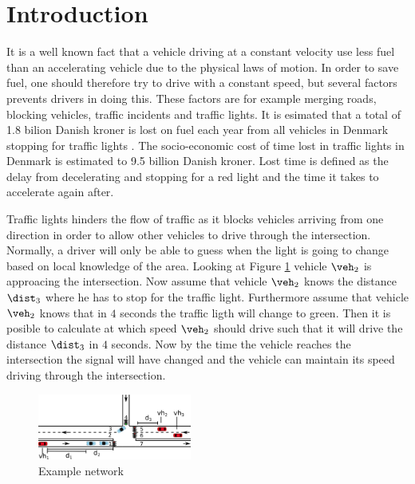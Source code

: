 \section{Introduction}

It is a well known fact that a vehicle driving at a constant velocity use less fuel than an accelerating vehicle due to the physical laws of motion\cite{Vejdir}.
In order to save fuel, one should therefore try to drive with a constant speed, but several factors prevents drivers in doing this. 
These factors are for example merging roads, blocking vehicles, traffic incidents and traffic lights. 
It is esimated that a total of 1.8 bilion Danish kroner is lost on fuel each year from all vehicles in Denmark stopping for traffic lights \cite{Vejdir}.
The socio-economic cost of time lost in traffic lights in Denmark is estimated to 9.5 billion Danish kroner. 
Lost time is defined as the delay from decelerating and stopping for a red light and the time it takes to accelerate again after\cite{Vejdir}. %

Traffic lights hinders the flow of traffic as it blocks vehicles arriving from one direction in order to allow other vehicles to drive through the intersection.
Normally, a driver will only be able to guess when the light is going to change based on local knowledge of the area. 
Looking at Figure \ref{fig:Introduction:network} vehicle $\veh_2$ is approacing the intersection.
Now assume that vehicle $\veh_2$ knows the distance $\dist_3$ where he has to stop for the traffic light. 
Furthermore assume that vehicle $\veh_2$ knows that in $4$ seconds the traffic ligth will change to green. 
Then it is posible to calculate at which speed $\veh_2$ should drive such that it will drive the distance $\dist_3$ in $4$ seconds. 
Now by the time the vehicle reaches the intersection the signal will have changed and the vehicle can maintain its speed driving through the intersection.
\begin{figure}[htb]
\centering
\includegraphics[width=0.45\textwidth]{../images/introNetwork.png}
\caption{Example network}
\label{fig:Introduction:network}
\end{figure}

